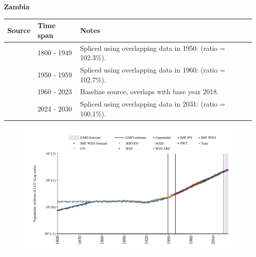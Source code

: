 \documentclass[12pt,a4paper,landscape]{article}
\begin{document}
\begin{adjustbox}{max totalsize={\paperwidth}{\paperheight},center}
\begin{minipage}[t][\textheight][t]{\textwidth}
\vspace*{0.5cm}
{}
\begin{center}
{\Large\bfseries Zambia}
\end{center}
\vspace{0.5cm}
\begin{table}[H]
\centering
\small
\begin{tabular}{|l|l|l|}
\hline
\textbf{Source} & \textbf{Time span} & \textbf{Notes} \\
\hline
\rowcolor{white}\cite{Gapminder}& 1800 - 1949 &Spliced using overlapping data in 1950: (ratio = 102.3\%).\\
\rowcolor{lightgray}\cite{IMF_IFS}& 1950 - 1959 &Spliced using overlapping data in 1960: (ratio = 102.7\%).\\
\rowcolor{white}\cite{WDI}& 1960 - 2023 &Baseline source, overlaps with base year 2018.\\
\rowcolor{lightgray}\cite{Gapminder}& 2024 - 2030 &Spliced using overlapping data in 2031: (ratio = 100.1\%).\\
\hline
\end{tabular}
\end{table}
\begin{figure}[H]
\centering
\includegraphics[width=\textwidth,height=0.6\textheight,keepaspectratio]{graphs/ZMB_pop.pdf}
\end{figure}
\end{minipage}
\end{adjustbox}
\end{document}
